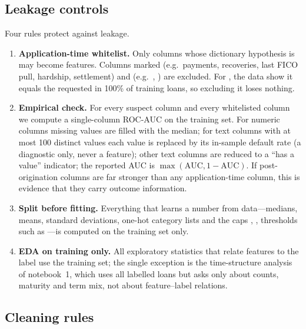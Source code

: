 \subsection{Leakage controls}
\label{sec:leakage}

Four rules protect against leakage.
\begin{enumerate}
    \item \textbf{Application-time whitelist.} Only columns whose dictionary hypothesis is  may become features. Columns marked  (e.g.\ payments, recoveries, last FICO pull, hardship, settlement) and  (e.g.\ , ) are excluded. For , the data show it equals the requested  in 100\% of training loans, so excluding it loses nothing.
    \item \textbf{Empirical check.} For every suspect column and every whitelisted column we compute a single-column ROC-AUC on the training set. For numeric columns missing values are filled with the median; for text columns with at most 100 distinct values each value is replaced by its in-sample default rate (a diagnostic only, never a feature); other text columns are reduced to a ``has a value'' indicator; the reported AUC is $\max(\mathrm{AUC},1-\mathrm{AUC})$. If post-origination columns are far stronger than any application-time column, this is evidence that they carry outcome information.
    \item \textbf{Split before fitting.} Everything that learns a number from data---medians, means, standard deviations, one-hot category lists and the caps , , thresholds such as ---is computed on the training set only.
    \item \textbf{EDA on training only.} All exploratory statistics that relate features to the label use the training set; the single exception is the time-structure analysis of notebook~1, which uses all labelled loans but asks only about counts, maturity and term mix, not about feature--label relations.
\end{enumerate}

\subsection{Cleaning rules}
\label{sec:clean}

